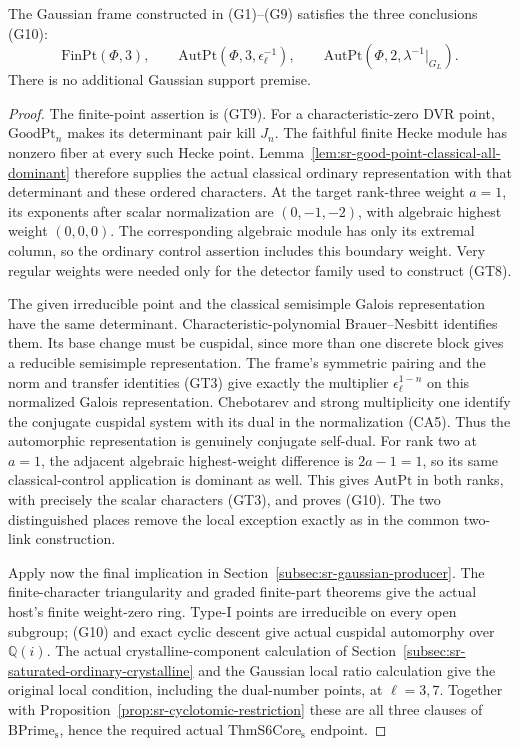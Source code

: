 \begin{srproposition}\label{prop:sr-gaussian-actual-g10}
The Gaussian frame constructed in (G1)--(G9) satisfies
the three conclusions (G10):
\[
 \mathrm{FinPt}(\Phi,3),\qquad
 \mathrm{AutPt}(\Phi,3,\epsilon_\ell^{-1}),\qquad
 \mathrm{AutPt}(\Phi,2,\lambda^{-1}|_{G_L}).
\]
There is no additional Gaussian support premise.
\end{srproposition}
\begin{proof}
The finite-point assertion is (GT9).
For a characteristic-zero DVR point, \(\mathrm{GoodPt}_n\)
makes its determinant pair kill \(J_n\).
The faithful finite Hecke module has nonzero fiber
at every such Hecke point.
Lemma~\ref{lem:sr-good-point-classical-all-dominant}
therefore supplies the actual classical ordinary
representation with that determinant and these
ordered characters.
At the target rank-three weight \(a=1\), its
exponents after scalar normalization are
\((0,-1,-2)\), with algebraic highest weight
\((0,0,0)\).
The corresponding algebraic module has only its
extremal column, so the ordinary control assertion
includes this boundary weight.
Very regular weights were needed only for the
detector family used to construct (GT8).

The given irreducible point and the classical
semisimple Galois representation have the same
determinant. Characteristic-polynomial
Brauer--Nesbitt identifies them.
Its base change must be cuspidal, since more than
one discrete block gives a reducible semisimple
representation. The frame's symmetric pairing and the norm and transfer
identities (GT3) give exactly the multiplier
\(\epsilon_\ell^{1-n}\) on this normalized
Galois representation.
Chebotarev and strong multiplicity one identify the
conjugate cuspidal system with its dual in the
normalization (CA5). Thus the automorphic representation
is genuinely conjugate self-dual.
For rank two at \(a=1\), the adjacent algebraic
highest-weight difference is \(2a-1=1\), so its same
classical-control application is dominant as well.
This gives \(\mathrm{AutPt}\) in both ranks, with
precisely the scalar characters (GT3), and proves (G10).
The two distinguished places remove the local
exception exactly as in the common two-link
construction.

Apply now the final implication in
Section~\ref{subsec:sr-gaussian-producer}.
The finite-character triangularity and graded
finite-part theorems give the actual host's finite
weight-zero ring. Type-I points are irreducible on
every open subgroup; (G10) and exact cyclic descent
give actual cuspidal automorphy over \(\mathbb Q(i)\).
The actual crystalline-component calculation of
Section~\ref{subsec:sr-saturated-ordinary-crystalline}
and the Gaussian local ratio calculation give
the original local condition, including the
dual-number points, at \(\ell=3,7\).
Together with
Proposition~\ref{prop:sr-cyclotomic-restriction}
these are all three clauses of
\(\mathrm{BPrime_s}\), hence the required actual
\(\mathrm{ThmS6Core_s}\) endpoint.
\end{proof}

